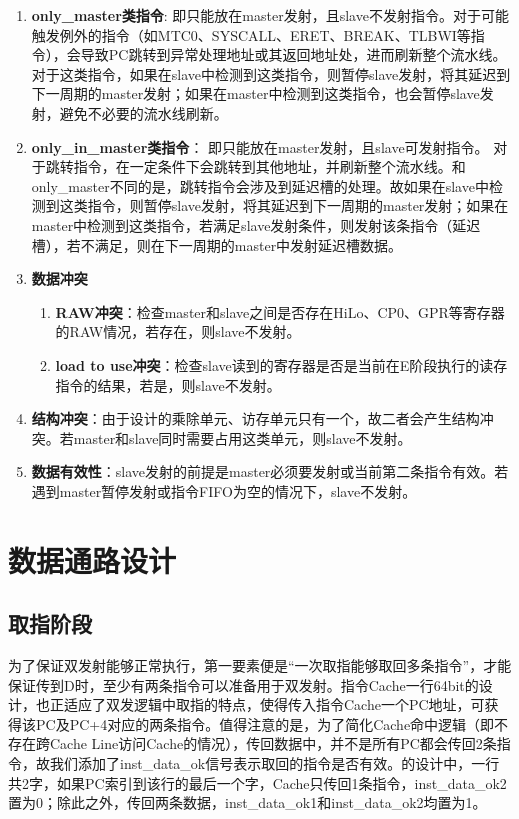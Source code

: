 \begin{enumerate}
    \item \textbf{only\_master类指令}: 即只能放在master发射，且slave不发射指令。对于可能触发例外的指令（如MTC0、SYSCALL、ERET、BREAK、TLBWI等指令），会导致PC跳转到异常处理地址或其返回地址处，进而刷新整个流水线。对于这类指令，如果在slave中检测到这类指令，则暂停slave发射，将其延迟到下一周期的master发射；如果在master中检测到这类指令，也会暂停slave发射，避免不必要的流水线刷新。
    \item \textbf{only\_in\_master类指令}： 即只能放在master发射，且slave可发射指令。 对于跳转指令，在一定条件下会跳转到其他地址，并刷新整个流水线。和only\_master不同的是，跳转指令会涉及到延迟槽的处理。故如果在slave中检测到这类指令，则暂停slave发射，将其延迟到下一周期的master发射；如果在master中检测到这类指令，若满足slave发射条件，则发射该条指令（延迟槽），若不满足，则在下一周期的master中发射延迟槽数据。
    \item \textbf{数据冲突}
    \begin{enumerate}
        \item \textbf{RAW冲突}：检查master和slave之间是否存在HiLo、CP0、GPR等寄存器的RAW情况，若存在，则slave不发射。
        \item \textbf{load to use冲突}：检查slave读到的寄存器是否是当前在E阶段执行的读存指令的结果，若是，则slave不发射。
    \end{enumerate}
    \item \textbf{结构冲突}：由于设计的乘除单元、访存单元只有一个，故二者会产生结构冲突。若master和slave同时需要占用这类单元，则slave不发射。
    \item \textbf{数据有效性}：slave发射的前提是master必须要发射或当前第二条指令有效。若遇到master暂停发射或指令FIFO为空的情况下，slave不发射。
\end{enumerate}


\section{数据通路设计}
\subsection{取指阶段}
为了保证双发射能够正常执行，第一要素便是“一次取指能够取回多条指令”，才能保证传到D时，至少有两条指令可以准备用于双发射。指令Cache一行64bit的设计，也正适应了双发逻辑中取指的特点，使得\cpuname 传入指令Cache一个PC地址，可获得该PC及PC+4对应的两条指令。值得注意的是，为了简化Cache命中逻辑（即不存在跨Cache Line访问Cache的情况），传回数据中，并不是所有PC都会传回2条指令，故我们添加了inst\_data\_ok信号表示取回的指令是否有效。\cpuname 的设计中，一行共2字，如果PC索引到该行的最后一个字，Cache只传回1条指令，inst\_data\_ok2置为0；除此之外，传回两条数据，inst\_data\_ok1和inst\_data\_ok2均置为1。

